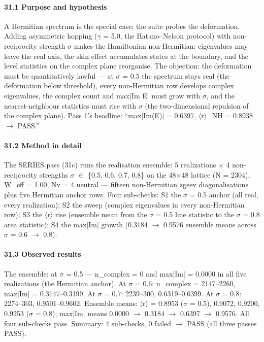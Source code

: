 \documentclass[10pt]{article}
\begin{document}
\paragraph{31.1 Purpose and hypothesis}

A Hermitian spectrum is the special case; the suite probes the deformation. Adding asymmetric hopping ($\gamma$ = 5.0, the Hatano--Nelson protocol) with non-reciprocity strength $\sigma$ makes the Hamiltonian non-Hermitian: eigenvalues may leave the real axis, the skin effect accumulates states at the boundary, and the level statistics on the complex plane reorganise. The objection: the deformation must be quantitatively lawful --- at $\sigma$ = 0.5 the spectrum stays real (the deformation below threshold), every non-Hermitian row develops complex eigenvalues, the complex count and max|Im E| must grow with $\sigma$, and the nearest-neighbour statistics must rise with $\sigma$ (the two-dimensional repulsion of the complex plane). Pass 1's headline: ``max|Im(E)| = 0.6397, $\langle$r$\rangle$\_NH = 0.8938 $\rightarrow$ PASS.''

\paragraph{31.2 Method in detail}

The SERIES pass (31c) runs the realisation ensemble: 5 realizations $\times$ 4 non-reciprocity strengths $\sigma$ $\in$ \{0.5, 0.6, 0.7, 0.8\} on the 48$\times$48 lattice (N = 2304), W\_eff = 1.00, Nv = 4 neutral --- fifteen non-Hermitian zgeev diagonalisations plus five Hermitian anchor rows. Four sub-checks: S1 the $\sigma$ = 0.5 anchor (all real, every realization); S2 the sweep (complex eigenvalues in every non-Hermitian row); S3 the $\langle$r$\rangle$ rise (ensemble mean from the $\sigma$ = 0.5 line statistic to the $\sigma$ = 0.8 area statistic); S4 the max|Im| growth (0.3184 $\rightarrow$ 0.9576 ensemble means across $\sigma$ = 0.6 $\rightarrow$ 0.8).

\paragraph{31.3 Observed results}

The ensemble: at $\sigma$ = 0.5 --- n\_complex = 0 and max|Im| = 0.0000 in all five realizations (the Hermitian anchor). At $\sigma$ = 0.6: n\_complex = 2147--2260, max|Im| = 0.3147--0.3199. At $\sigma$ = 0.7: 2239--300, 0.6319--0.6399. At $\sigma$ = 0.8: 2274--303, 0.9501--0.9602. Ensemble means: $\langle$r$\rangle$ = 0.8953 ($\sigma$ = 0.5), 0.9072, 0.9200, 0.9253 ($\sigma$ = 0.8); max|Im| means 0.0000 $\rightarrow$ 0.3184 $\rightarrow$ 0.6397 $\rightarrow$ 0.9576. All four sub-checks pass. Summary: 4 sub-checks, 0 failed $\rightarrow$ PASS (all three passes PASS).
\end{document}
